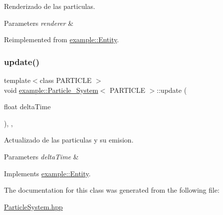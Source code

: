 Renderizado de las particulas. 


\begin{DoxyParams}{Parameters}
{\em renderer} & \\
\hline
\end{DoxyParams}


Reimplemented from \mbox{\hyperlink{classexample_1_1_entity_a44477ee1f9ac52e9073ae0f78ba735d5}{example\+::\+Entity}}.

\mbox{\label{classexample_1_1_particle___system_a28602cfbbff3c7762da1ccbc7324f8f8}} 
\subsubsection{\texorpdfstring{update()}{update()}}
{\footnotesize\ttfamily template$<$class P\+A\+R\+T\+I\+C\+LE $>$ \\
void \mbox{\hyperlink{classexample_1_1_particle___system}{example\+::\+Particle\+\_\+\+System}}$<$ P\+A\+R\+T\+I\+C\+LE $>$\+::update (\begin{DoxyParamCaption}\item[{float}]{delta\+Time }\end{DoxyParamCaption})\hspace{0.3cm}{\ttfamily [inline]}, {\ttfamily [override]}, {\ttfamily [virtual]}}



Actualizado de las particulas y su emision. 


\begin{DoxyParams}{Parameters}
{\em delta\+Time} & \\
\hline
\end{DoxyParams}


Implements \mbox{\hyperlink{classexample_1_1_entity_a5dded5c361451f2cfdf7ed3c7de1194f}{example\+::\+Entity}}.



The documentation for this class was generated from the following file\+:\begin{DoxyCompactItemize}
\item 
\mbox{\hyperlink{_particle_system_8hpp}{Particle\+System.\+hpp}}\end{DoxyCompactItemize}
